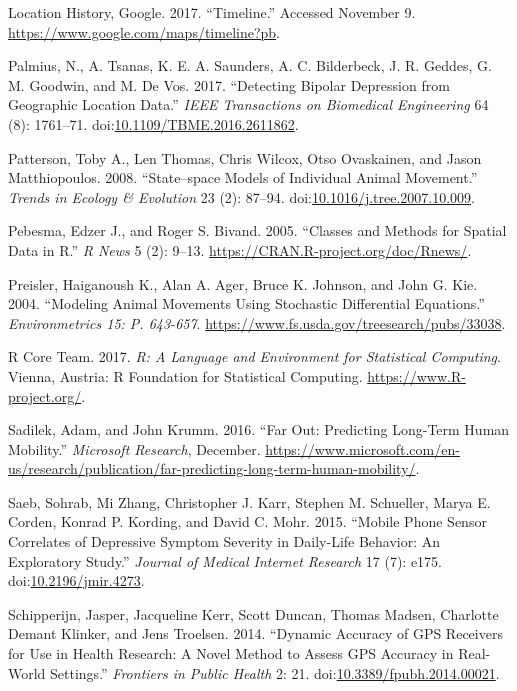 \documentclass[]{article}
\begin{document}
\hypertarget{ref-location_history_timeline_nodate}{}
Location History, Google. 2017. ``Timeline.'' Accessed November 9.
\url{https://www.google.com/maps/timeline?pb}.

\hypertarget{ref-palmius_detecting_2017}{}
Palmius, N., A. Tsanas, K. E. A. Saunders, A. C. Bilderbeck, J. R.
Geddes, G. M. Goodwin, and M. De Vos. 2017. ``Detecting Bipolar
Depression from Geographic Location Data.'' \emph{IEEE Transactions on
Biomedical Engineering} 64 (8): 1761--71.
doi:\href{https://doi.org/10.1109/TBME.2016.2611862}{10.1109/TBME.2016.2611862}.

\hypertarget{ref-patterson_statespace_2008}{}
Patterson, Toby A., Len Thomas, Chris Wilcox, Otso Ovaskainen, and Jason
Matthiopoulos. 2008. ``State--space Models of Individual Animal
Movement.'' \emph{Trends in Ecology \& Evolution} 23 (2): 87--94.
doi:\href{https://doi.org/10.1016/j.tree.2007.10.009}{10.1016/j.tree.2007.10.009}.

\hypertarget{ref-sp1}{}
Pebesma, Edzer J., and Roger S. Bivand. 2005. ``Classes and Methods for
Spatial Data in R.'' \emph{R News} 5 (2): 9--13.
\url{https://CRAN.R-project.org/doc/Rnews/}.

\hypertarget{ref-preisler_modeling_2004}{}
Preisler, Haiganoush K., Alan A. Ager, Bruce K. Johnson, and John G.
Kie. 2004. ``Modeling Animal Movements Using Stochastic Differential
Equations.'' \emph{Environmetrics 15: P. 643-657}.
\url{https://www.fs.usda.gov/treesearch/pubs/33038}.

\hypertarget{ref-base}{}
R Core Team. 2017. \emph{R: A Language and Environment for Statistical
Computing}. Vienna, Austria: R Foundation for Statistical Computing.
\url{https://www.R-project.org/}.

\hypertarget{ref-sadilek_far_2016}{}
Sadilek, Adam, and John Krumm. 2016. ``Far Out: Predicting Long-Term
Human Mobility.'' \emph{Microsoft Research}, December.
\url{https://www.microsoft.com/en-us/research/publication/far-predicting-long-term-human-mobility/}.

\hypertarget{ref-saeb_mobile_2015}{}
Saeb, Sohrab, Mi Zhang, Christopher J. Karr, Stephen M. Schueller, Marya
E. Corden, Konrad P. Kording, and David C. Mohr. 2015. ``Mobile Phone
Sensor Correlates of Depressive Symptom Severity in Daily-Life Behavior:
An Exploratory Study.'' \emph{Journal of Medical Internet Research} 17
(7): e175.
doi:\href{https://doi.org/10.2196/jmir.4273}{10.2196/jmir.4273}.

\hypertarget{ref-schipperijn_dynamic_2014}{}
Schipperijn, Jasper, Jacqueline Kerr, Scott Duncan, Thomas Madsen,
Charlotte Demant Klinker, and Jens Troelsen. 2014. ``Dynamic Accuracy of
GPS Receivers for Use in Health Research: A Novel Method to Assess GPS
Accuracy in Real-World Settings.'' \emph{Frontiers in Public Health} 2:
21.
doi:\href{https://doi.org/10.3389/fpubh.2014.00021}{10.3389/fpubh.2014.00021}.
\end{document}
